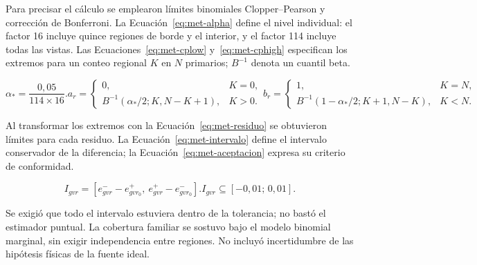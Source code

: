 Para precisar el cálculo se emplearon límites binomiales Clopper--Pearson y corrección de Bonferroni. La Ecuación~\eqref{eq:met-alpha} define el nivel individual: el factor 16 incluye quince regiones de borde y el interior, y el factor 114 incluye todas las vistas. Las Ecuaciones~\eqref{eq:met-cplow} y~\eqref{eq:met-cphigh} especifican los extremos para un conteo regional $K$ en $N$ primarios; $B^{-1}$ denota un cuantil beta.
\begin{samepage}
\begin{subequations}
\begin{equation}\alpha_* = \frac{0{,}05}{114\times16}.\label{eq:met-alpha}\end{equation}
\begin{equation}a_r=\begin{cases}0,&K=0,\\ B^{-1}(\alpha_*/2;K,N-K+1),&K>0.\end{cases}\label{eq:met-cplow}\end{equation}
\begin{equation}b_r=\begin{cases}1,&K=N,\\ B^{-1}(1-\alpha_*/2;K+1,N-K),&K<N.\end{cases}\label{eq:met-cphigh}\end{equation}
\end{subequations}
\end{samepage}
Al transformar los extremos con la Ecuación~\eqref{eq:met-residuo} se obtuvieron límites para cada residuo. La Ecuación~\eqref{eq:met-intervalo} define el intervalo conservador de la diferencia; la Ecuación~\eqref{eq:met-aceptacion} expresa su criterio de conformidad.
\begin{samepage}
\begin{subequations}
\begin{equation}I_{gvr}=[e^-_{gvr}-e^+_{gvr_0},\ e^+_{gvr}-e^-_{gvr_0}].\label{eq:met-intervalo}\end{equation}
\begin{equation}I_{gvr}\subseteq[-0{,}01;\,0{,}01].\label{eq:met-aceptacion}\end{equation}
\end{subequations}
\end{samepage}
Se exigió que todo el intervalo estuviera dentro de la tolerancia; no bastó el estimador puntual. La cobertura familiar se sostuvo bajo el modelo binomial marginal, sin exigir independencia entre regiones. No incluyó incertidumbre de las hipótesis físicas de la fuente ideal.

